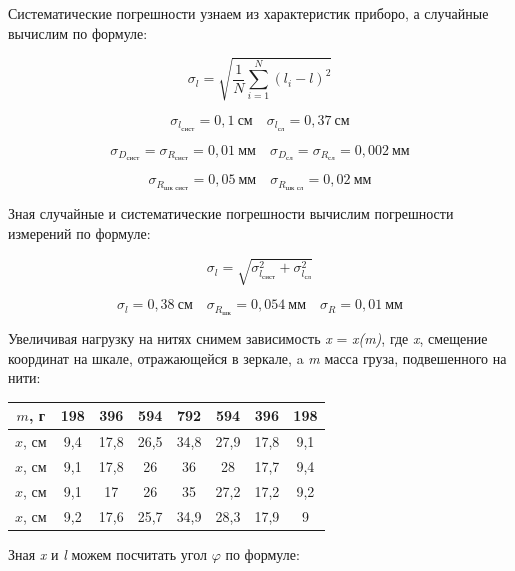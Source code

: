 \documentclass[12pt,a4paper]{article}
\begin{document}
Систематические погрешности узнаем из характеристик приборо, а случайные вычислим по формуле:

\begin{equation}\label{14}
\sigma_l = \sqrt{\frac{1}{N} \sum\limits_{\textit{i} = 1}^N (l_{\textit{i}} - l)^2}
\end{equation}

\[\sigma_{l_{\text{сист}}} = 0,1 \: \textit{см} \quad \sigma_{l_{\text{сл}}} = 0,37\: \textit{см}\]

\[\sigma_{D_{\text{сист}}} = \sigma_{R_{\text{сист}}} =  0,01\: \textit{мм} \quad \sigma_{D_{\text{сл}}} = \sigma_{R_{\text{сл}}} = 0,002 \: \textit{мм} \]

\[\sigma_{R_{\text{шк сист}}} =  0,05\: \textit{мм} \quad \sigma_{R_{\text{шк сл}}} = 0,02 \: \textit{мм} \]

Зная случайные и систематические погрешности вычислим погрешности измерений по формуле:

\begin{equation}\label{15}
\sigma_l = \sqrt{\sigma_{l_{\text{сист}}}^2 + \sigma_{l_{\text{сл}}}^2}
\end{equation}

\[\sigma_l = 0,38 \: \textit{см} \quad \sigma_{R_{\text{шк}}} = 0,054\:\textit{мм} \quad \sigma_R = 0,01 \: \textit{мм}\]

Увеличивая нагрузку на нитях снимем зависимость \textit{x} = \textit{x(m)}, где \textit{x}, смещение координат на шкале, отражающейся в зеркале, a \textit{m} масса груза, подвешенного на нити:

\vspace{0,5cm}

\begin{tabular}{|c|c|c|c|c|c|c|c|}
\hline
$m$, г & 198 & 396 & 594 & 792 & 594 & 396 & 198 \\
\hline
$x$, см & 9,4 & 17,8 & 26,5 & 34,8 & 27,9 & 17,8 & 9,1 \\
\hline
$x$, см & 9,1 & 17,8 & 26 & 36 & 28 & 17,7 & 9,4 \\
\hline
$x$, см & 9,1 & 17 & 26 & 35 & 27,2 & 17,2 & 9,2 \\
\hline
$x$, см & 9,2 & 17,6 & 25,7 & 34,9 & 28,3 & 17,9 & 9 \\
\hline
\end{tabular}  

\vspace{0,5cm}

Зная \textit{x} и \textit{l} можем посчитать угол $\varphi$ по формуле:
\end{document}
